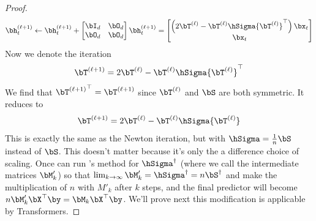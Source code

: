 \begin{proof}
    \begin{equation}
        \bh_t^{(\ell+1)} \leftarrow \bh_t^{(\ell+1)} + \begin{bmatrix}
            \bI_d & \bO_d \\ 
            \bO_d & \bO_d 
        \end{bmatrix} \bh_t^{(\ell+1)} = \begin{bmatrix}
        \left(2\bT^{(\ell)} -  \bT^{(\ell)} \hSigma {\bT^{(\ell)}}^\top \right) \bx_t \\ \bx_t 
    \end{bmatrix}
    \end{equation}
    Now we denote the iteration
    \begin{equation}
        \bT^{(\ell+1)} = 2\bT^{(\ell)} -  \bT^{(\ell)} \hSigma {\bT^{(\ell)}}^\top
    \end{equation}
    We find that ${\bT^{(\ell+1)}}^\top =  \bT^{(\ell+1)}$ since $ \bT^{(\ell)}$ and $\bS$ are both symmetric. It reduces to 
    \begin{equation}
        \bT^{(\ell+1)} = 2\bT^{(\ell)} -  \bT^{(\ell)} \hSigma {\bT^{(\ell)}}
    \end{equation}
    This is exactly the same as the Newton iteration, but with $\hSigma = \frac{1}{n} \bS$ instead of $\bS$. This doesn't matter because it's only the a difference choice of scaling. Once can run \newton's method for $\hSigma^\dagger$ (where we call the intermediate matrices $\bM'_k$) so that $\lim_{k \rightarrow \infty} \bM'_k = \hSigma^\dagger = n \bS^\dagger$ and make the multiplication of $n$ with $M'_k$ after $k$ steps, and the final predictor will become $n \bM'_k \bX^\top \by = \bM_k \bX^\top \by$. We'll prove next this modification is applicable by Transformers. 



\end{proof}
